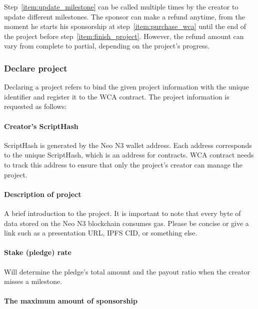 \documentclass[12pt,a4paper]{article}
\begin{document}
    Step~\ref{item:update_milestone} can be called multiple times by the creator
    to update different milestones.
    The sponsor can make a refund anytime, from the moment he starts his sponsorship
    at step~\ref{item:purchase_wca} until the end of the project before
    step~\ref{item:finish_project}.
    However, the refund amount can vary from complete to partial, depending on
    the project's progress.

    \subsubsection{Declare project}

    Declaring a project refers to bind the given project information with the
    unique identifier and register it to the WCA contract.
    The project information is requested as follows:

    \paragraph{Creator's ScriptHash}

    ScriptHash is generated by the Neo N3 wallet address.
    Each address corresponds to the unique ScriptHash, which is an address for
    contracts.
    WCA contract needs to track this address to ensure that only the project's
    creator can manage the project.

    \paragraph{Description of project}

    A brief introduction to the project.
    It is important to note that every byte of data stored on the Neo N3 blockchain
    consumes gas.
    Please be concise or give a link such as a presentation URL, IPFS CID, or
    something else.

    \paragraph{Stake (pledge) rate}

    Will determine the pledge's total amount and the payout ratio when the
    creator misses a milestone.

    \paragraph{The maximum amount of sponsorship}
\end{document}

